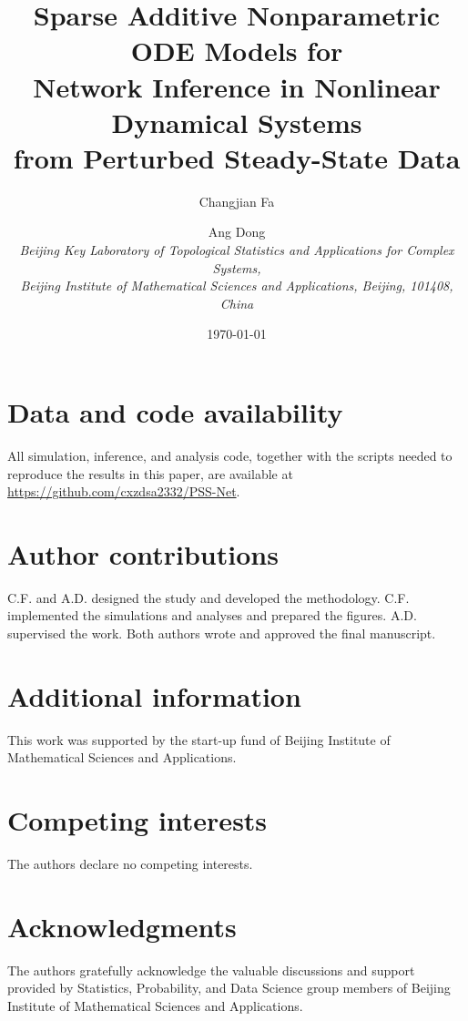 \documentclass[11pt]{article}
\title{Sparse Additive Nonparametric ODE Models for\\
       Network Inference in Nonlinear Dynamical Systems\\
       from Perturbed Steady-State Data}
\author{Changjian Fa \and Ang Dong \\[4pt]
  \textit{Beijing Key Laboratory of Topological Statistics and Applications for
  Complex Systems,}\\
  \textit{Beijing Institute of Mathematical Sciences and Applications, Beijing,
  101408, China}}
\date{\today}
\begin{document}
\maketitle

\begin{abstract}

\end{abstract}







\section*{Data and code availability}
All simulation, inference, and analysis code, together with the scripts needed to
reproduce the results in this paper, are available at
\url{https://github.com/cxzdsa2332/PSS-Net}.

\section*{Author contributions}
C.F. and A.D. designed the study and developed the methodology. C.F. implemented
the simulations and analyses and prepared the figures. A.D. supervised the work.
Both authors wrote and approved the final manuscript.

\section*{Additional information}
This work was supported by the start-up fund of Beijing Institute of Mathematical
Sciences and Applications.

\section*{Competing interests}
The authors declare no competing interests.

\section*{Acknowledgments}
The authors gratefully acknowledge the valuable discussions and support provided
by Statistics, Probability, and Data Science group members of Beijing Institute
of Mathematical Sciences and Applications.




\appendix

\end{document}
